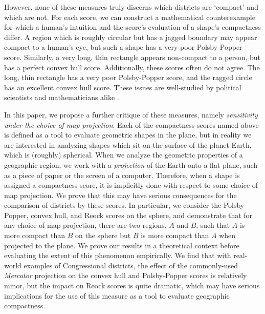 However, none of these measures truly discerns which districts are `compact' and which are not. 
For each score, we can construct a 
mathematical counterexample for which
a human's intuition and the score's evaluation of a shape's
compactness differ.  A region which is roughly circular but has a jagged boundary 
may appear compact to a human's eye, but such a shape has a very poor Polsby-Popper score.  Similarly, a very long, thin rectangle appears non-compact to a person, but has a perfect convex hull score.  Additionally, these scores often do not agree.
The long, thin rectangle has a  very
poor Polsby-Popper score, and the ragged circle has an excellent convex hull score.  These issues are well-studied by political
scientists and mathematicians alike
\cite{polsby1991third,frolov1975shape,maceachren1985compact,barnes2018gerrymandering}.




In this paper, we propose a further critique of these measures, namely
\textit{sensitivity under the choice of map projection}.  Each of the
compactness scores named above is defined as a tool to evaluate
geometric shapes in the plane, but in reality we are interested in
analyzing shapes which sit on the surface of the planet Earth, which
is (roughly) spherical.  
When we analyze the geometric properties of a geographic region, we work 
with a \textit{projection} of the Earth onto a flat plane, such as a piece of 
paper or the screen of a computer.
Therefore, when a shape is assigned a compactness score,
it is implicitly done with respect to some choice of map projection.
We prove that this may have
serious consequences for the comparison of districts by these scores.  In
particular, we consider the Polsby-Popper, convex hull,
and Reock scores on the sphere, and demonstrate that for any choice of
map projection, there are two regions, $A$ and $B$, such that $A$ is
more compact than $B$ on the sphere but $B$ is more compact than $A$
when projected to the plane.  We prove our results in a theoretical context 
before evaluating the extent of this phenomenon empirically.  We find 
that with real-world examples of Congressional districts, the effect 
of the commonly-used \textit{Mercator} projection on the convex 
hull and Polsby-Popper scores is relatively minor, but the impact on 
Reock scores is quite dramatic, which may have serious implications 
for the use of this measure as a tool to evaluate geographic compactness.

